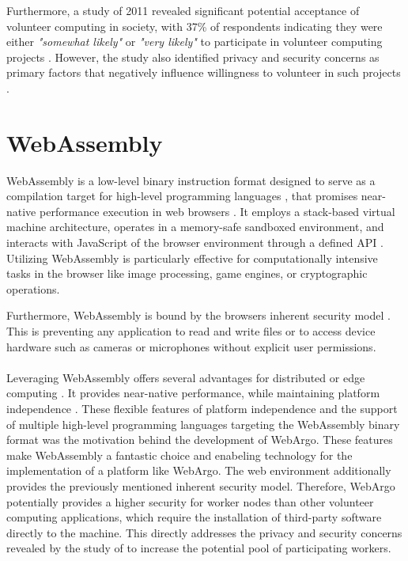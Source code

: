 Furthermore, a study of 2011 revealed significant potential acceptance of volunteer computing in society, with 37\% of respondents indicating they were either \emph{"somewhat likely"} or \emph{"very likely"} to participate in volunteer computing projects \cite{intro:volunteerStudy}. However, the study also identified privacy and security concerns as primary factors that negatively influence willingness to volunteer in such projects \cite{intro:volunteerStudy}.

\section{WebAssembly}
\label{sec:background:webassembly}
WebAssembly is a low-level binary instruction format designed to serve as a compilation target for high-level programming languages \cite{methodology:wasm, methodology:wasmW3C, methodology:wasm2}, that promises near-native performance execution in web browsers \cite{methodology:wasm, methodology:wasmW3C, relatedwork:wasmedgecomputing}. It employs a stack-based virtual machine architecture, operates in a memory-safe sandboxed environment, and interacts with JavaScript of the browser environment through a defined \ac{API} \cite{methodology:wasm, methodology:wasmW3C, methodology:wasm2, methodology:wasmdocu}. Utilizing WebAssembly is particularly effective for computationally intensive tasks in the browser \cite{methodology:wasm2, methodology:wasmW3C} like image processing, game engines, or cryptographic operations.

Furthermore, WebAssembly is bound by the browsers inherent security model \cite{methodology:wasmW3C, methodology:wasm2, methodology:wasmdocu}. This is preventing any application to read and write ﬁles or to access device hardware such as cameras or microphones without explicit user permissions. 
\\~\\
Leveraging WebAssembly offers several advantages for distributed or edge computing \cite{relatedwork:wasmedgecomputing}. It provides near-native performance, while maintaining platform independence \cite{methodology:wasm, methodology:wasmW3C, relatedwork:wasmedgecomputing}. These flexible features of platform independence and the support of multiple high-level programming languages targeting the WebAssembly binary format \cite{methodology:wasmW3C} was the motivation behind the development of WebArgo. These features make WebAssembly a fantastic choice and enabeling technology for the implementation of a platform like WebArgo. The web environment additionally provides the previously mentioned inherent security model. Therefore, WebArgo potentially provides a higher security for worker nodes than other volunteer computing applications, which require the installation of third-party software directly to the machine. This directly addresses the privacy and security concerns revealed by the study of \citeauthor{intro:volunteerStudy} \cite{intro:volunteerStudy} to increase the potential pool of participating workers.

